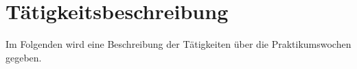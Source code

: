 

\chapter{Tätigkeitsbeschreibung} \label{ch:wochenberichte-initial}

Im Folgenden wird eine Beschreibung der Tätigkeiten über die Praktikumswochen gegeben.





































%


%


%

